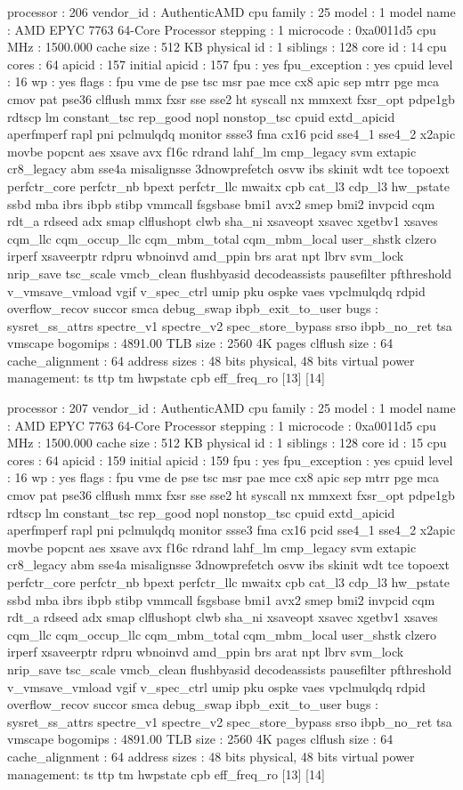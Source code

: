 processor	: 206
vendor_id	: AuthenticAMD
cpu family	: 25
model		: 1
model name	: AMD EPYC 7763 64-Core Processor
stepping	: 1
microcode	: 0xa0011d5
cpu MHz		: 1500.000
cache size	: 512 KB
physical id	: 1
siblings	: 128
core id		: 14
cpu cores	: 64
apicid		: 157
initial apicid	: 157
fpu		: yes
fpu_exception	: yes
cpuid level	: 16
wp		: yes
flags		: fpu vme de pse tsc msr pae mce cx8 apic sep mtrr pge mca cmov pat pse36 clflush mmx fxsr sse sse2 ht syscall nx mmxext fxsr_opt pdpe1gb rdtscp lm constant_tsc rep_good nopl nonstop_tsc cpuid extd_apicid aperfmperf rapl pni pclmulqdq monitor ssse3 fma cx16 pcid sse4_1 sse4_2 x2apic movbe popcnt aes xsave avx f16c rdrand lahf_lm cmp_legacy svm extapic cr8_legacy abm sse4a misalignsse 3dnowprefetch osvw ibs skinit wdt tce topoext perfctr_core perfctr_nb bpext perfctr_llc mwaitx cpb cat_l3 cdp_l3 hw_pstate ssbd mba ibrs ibpb stibp vmmcall fsgsbase bmi1 avx2 smep bmi2 invpcid cqm rdt_a rdseed adx smap clflushopt clwb sha_ni xsaveopt xsavec xgetbv1 xsaves cqm_llc cqm_occup_llc cqm_mbm_total cqm_mbm_local user_shstk clzero irperf xsaveerptr rdpru wbnoinvd amd_ppin brs arat npt lbrv svm_lock nrip_save tsc_scale vmcb_clean flushbyasid decodeassists pausefilter pfthreshold v_vmsave_vmload vgif v_spec_ctrl umip pku ospke vaes vpclmulqdq rdpid overflow_recov succor smca debug_swap ibpb_exit_to_user
bugs		: sysret_ss_attrs spectre_v1 spectre_v2 spec_store_bypass srso ibpb_no_ret tsa vmscape
bogomips	: 4891.00
TLB size	: 2560 4K pages
clflush size	: 64
cache_alignment	: 64
address sizes	: 48 bits physical, 48 bits virtual
power management: ts ttp tm hwpstate cpb eff_freq_ro [13] [14]

processor	: 207
vendor_id	: AuthenticAMD
cpu family	: 25
model		: 1
model name	: AMD EPYC 7763 64-Core Processor
stepping	: 1
microcode	: 0xa0011d5
cpu MHz		: 1500.000
cache size	: 512 KB
physical id	: 1
siblings	: 128
core id		: 15
cpu cores	: 64
apicid		: 159
initial apicid	: 159
fpu		: yes
fpu_exception	: yes
cpuid level	: 16
wp		: yes
flags		: fpu vme de pse tsc msr pae mce cx8 apic sep mtrr pge mca cmov pat pse36 clflush mmx fxsr sse sse2 ht syscall nx mmxext fxsr_opt pdpe1gb rdtscp lm constant_tsc rep_good nopl nonstop_tsc cpuid extd_apicid aperfmperf rapl pni pclmulqdq monitor ssse3 fma cx16 pcid sse4_1 sse4_2 x2apic movbe popcnt aes xsave avx f16c rdrand lahf_lm cmp_legacy svm extapic cr8_legacy abm sse4a misalignsse 3dnowprefetch osvw ibs skinit wdt tce topoext perfctr_core perfctr_nb bpext perfctr_llc mwaitx cpb cat_l3 cdp_l3 hw_pstate ssbd mba ibrs ibpb stibp vmmcall fsgsbase bmi1 avx2 smep bmi2 invpcid cqm rdt_a rdseed adx smap clflushopt clwb sha_ni xsaveopt xsavec xgetbv1 xsaves cqm_llc cqm_occup_llc cqm_mbm_total cqm_mbm_local user_shstk clzero irperf xsaveerptr rdpru wbnoinvd amd_ppin brs arat npt lbrv svm_lock nrip_save tsc_scale vmcb_clean flushbyasid decodeassists pausefilter pfthreshold v_vmsave_vmload vgif v_spec_ctrl umip pku ospke vaes vpclmulqdq rdpid overflow_recov succor smca debug_swap ibpb_exit_to_user
bugs		: sysret_ss_attrs spectre_v1 spectre_v2 spec_store_bypass srso ibpb_no_ret tsa vmscape
bogomips	: 4891.00
TLB size	: 2560 4K pages
clflush size	: 64
cache_alignment	: 64
address sizes	: 48 bits physical, 48 bits virtual
power management: ts ttp tm hwpstate cpb eff_freq_ro [13] [14]

